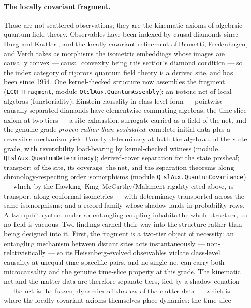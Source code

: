 \paragraph{The locally covariant fragment.} These are not scattered
observations; they are the kinematic axioms of algebraic quantum
field theory. Observables have been indexed by causal diamonds
since Haag and Kastler \cite{haagkastler64}, and the locally
covariant refinement of Brunetti, Fredenhagen, and Verch
\cite{brunetti01} takes as morphisms the isometric embeddings whose
images are causally convex --- causal convexity being this
section's diamond condition --- so the index category of rigorous
quantum field theory is a derived site, and has been since 1964.
One kernel-checked structure now assembles the fragment
(\texttt{LCQFTFragment}, module \texttt{QtslAux.QuantumAssembly}):
an isotone net of local algebras (functoriality); Einstein
causality in class-level form --- pointwise causally separated
diamonds have elementwise-commuting algebras; the time-slice axiom
at two tiers --- a site-exhaustion surrogate carried as a field of
the net, and the genuine grade \emph{proven rather than
postulated}: complete initial data plus a reversible mechanism
yield Cauchy determinacy at both the algebra and the state grade,
with reversibility load-bearing by kernel-checked witness (module
\texttt{QtslAux.QuantumDeterminacy}); derived-cover separation for
the state presheaf; transport of the site, its coverage, the net,
and the separation theorems along chronology-respecting order
isomorphisms (module \texttt{QtslAux.QuantumCovariance}) --- which,
by the Hawking--King--McCarthy/Malament rigidity cited above, is
transport along conformal isometries --- with determinacy
transported across the same isomorphisms; and a record family whose
shadow lands in probability rows. A two-qubit system under an
entangling coupling inhabits the whole structure, so no field is
vacuous. Two findings earned their way into the structure rather
than being designed into it. First, the fragment is a two-tier
object of necessity: an entangling mechanism between distant sites
acts instantaneously --- non-relativistically --- so its
Heisenberg-evolved observables violate class-level causality at
unequal-time spacelike pairs, and no single net can carry both
microcausality and the genuine time-slice property at this grade.
The kinematic net and the matter data are therefore separate
tiers, tied by a shadow equation --- the net is the frozen,
dynamics-off shadow of the matter data --- which is where the
locally covariant axioms themselves place dynamics: the time-slice
